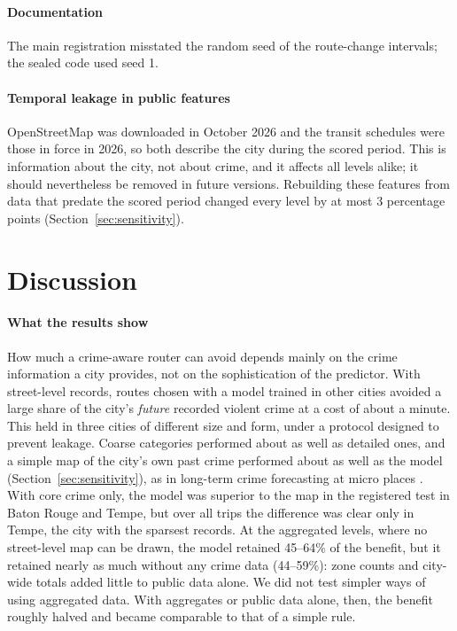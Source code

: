 \documentclass[preprint,12pt,authoryear]{elsarticle}
\begin{document}
\paragraph{Documentation} The main registration misstated the random seed of the route-change intervals; the sealed code used seed 1.

\paragraph{Temporal leakage in public features} OpenStreetMap was downloaded in October 2026 and the transit schedules were those in force in 2026, so both describe the city during the scored period. This is information about the city, not about crime, and it affects all levels alike; it should nevertheless be removed in future versions. Rebuilding these features from data that predate the scored period changed every level by at most 3 percentage points (Section~\ref{sec:sensitivity}).

\section{Discussion}\label{sec:discussion}

\paragraph{What the results show} How much a crime-aware router can avoid depends mainly on the crime information a city provides, not on the sophistication of the predictor. With street-level records, routes chosen with a model trained in other cities avoided a large share of the city's \emph{future} recorded violent crime at a cost of about a minute. This held in three cities of different size and form, under a protocol designed to prevent leakage. Coarse categories performed about as well as detailed ones, and a simple map of the city's own past crime performed about as well as the model (Section~\ref{sec:sensitivity}), as in long-term crime forecasting at micro places \citep{wheeler2021rtm}. With core crime only, the model was superior to the map in the registered test in Baton Rouge and Tempe, but over all trips the difference was clear only in Tempe, the city with the sparsest records. At the aggregated levels, where no street-level map can be drawn, the model retained 45--64\% of the benefit, but it retained nearly as much without any crime data (44--59\%): zone counts and city-wide totals added little to public data alone. We did not test simpler ways of using aggregated data. With aggregates or public data alone, then, the benefit roughly halved and became comparable to that of a simple rule.
\end{document}
